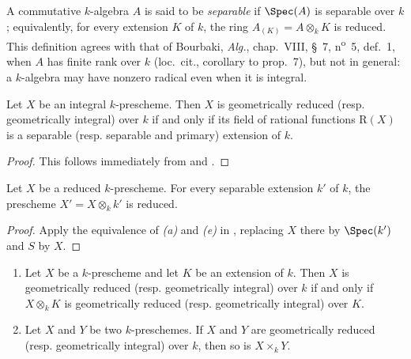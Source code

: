 A commutative $k$-algebra $A$ is said to be \emph{separable} if
$\Spec(A)$ is separable over $k$; equivalently, for every extension
$K$ of $k$, the ring $A_{(K)}=A\otimes_k K$ is reduced.
This definition agrees with that of Bourbaki, \emph{Alg.}, chap.~VIII,
\S~7, n\textsuperscript{o}~5, def.~1, when $A$ has finite rank over
$k$ (loc.\ cit., corollary to prop.~7), but not in general: a
$k$-algebra may have nonzero radical even when it is integral.

\begin{corollary}[4.6.3]
\label{IV.4.6.3}
Let $X$ be an integral $k$-prescheme.
Then $X$ is geometrically reduced \textup{(resp.} geometrically integral\textup{)} over
$k$ if and only if its field of rational functions $\mathrm{R}(X)$ is
a separable \textup{(resp.} separable and primary\textup{)} extension of $k$.
\end{corollary}

\begin{proof}
This follows immediately from  and
.
\end{proof}

\begin{corollary}[4.6.4]
\label{IV.4.6.4}
Let $X$ be a reduced $k$-prescheme.
For every separable extension $k'$ of $k$, the prescheme
$X'=X\otimes_k k'$ is reduced.
\end{corollary}

\begin{proof}
Apply the equivalence of \emph{(a)} and \emph{(e)} in
, replacing $X$ there by $\Spec(k')$ and $S$ by $X$.
\end{proof}

\begin{proposition}[4.6.5]
\label{IV.4.6.5}
\begin{enumerate}
\item[\rm(i)]
\label{IV.4.6.5.i}
Let $X$ be a $k$-prescheme and let $K$ be an extension of $k$.
Then $X$ is geometrically reduced \textup{(resp.} geometrically integral\textup{)} over
$k$ if and only if $X\otimes_k K$ is geometrically reduced
\textup{(resp.} geometrically integral\textup{)} over $K$.

\item[\rm(ii)]
\label{IV.4.6.5.ii}
Let $X$ and $Y$ be two $k$-preschemes.
If $X$ and $Y$ are geometrically reduced
\textup{(resp.} geometrically integral\textup{)} over $k$, then so is $X\times_k Y$.
\end{enumerate}
\end{proposition}

